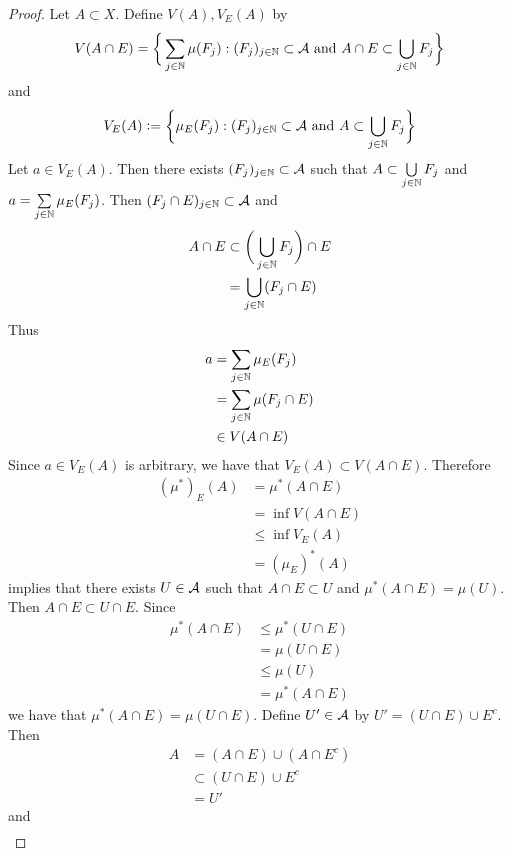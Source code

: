 \documentclass{book}
\begin{document}
	\begin{proof}
		Let $A \subset X$. Define $V(A), V_E(A)$ by 
		$$V(A \cap E) = \bigg \{\sum_{j \in \mathbb{N}} \mu(F_j): (F_j)_{j \in \mathbb{N}} \subset \mathcal{A} \text{ and } A \cap E \subset \bigcup\limits_{j \in \mathbb{N}} F_j \bigg \}$$ 
		and 
		$$V_E(A) \vcentcolon=  \bigg \{\mu_E(F_j): (F_j)_{j \in \mathbb{N}} \subset \mathcal{A} \text{ and } A \subset \bigcup\limits_{j \in \mathbb{N}} F_j  \bigg\}$$
		Let $a \in V_E(A)$. Then there exists $(F_j)_{j \in \mathbb{N}} \subset \mathcal{A}$ such that $A \subset \bigcup\limits_{j \in \mathbb{N}} F_j$ and $a = \sum\limits_{j \in \mathbb{N}} \mu_E(F_j)$. Then $(F_j \cap E)_{j \in \mathbb{N}} \subset \mathcal{A}$ and 
		\begin{align*}
			A \cap E
			& \subset \bigg( \bigcup\limits_{j \in \mathbb{N}} F_j \bigg) \cap E \\
			& = \bigcup\limits_{j \in \mathbb{N}} (F_j  \cap E)
		\end{align*}
		Thus 
		\begin{align*}
			a
			& = \sum\limits_{j \in \mathbb{N}} \mu_E(F_j) \\
			& = \sum\limits_{j \in \mathbb{N}} \mu(F_j \cap E) \\
			& \in V(A \cap E) 
		\end{align*}
		Since $a \in V_E(A)$ is arbitrary, we have that $V_E(A) \subset V(A \cap E)$. Therefore
		\begin{align*}
			(\mu^*)_E(A)
			& = \mu^*(A \cap E) \\
			& = \inf V(A \cap E) \\
			& \leq \inf V_E(A) \\
			& = (\mu_E)^*(A)
		\end{align*}
		 implies that there exists $U \in \mathcal{A}$ such that $A \cap E \subset U$ and $\mu^*(A \cap E) = \mu(U)$. Then $A \cap E \subset U \cap E$. Since 
		\begin{align*}
			\mu^*(A \cap E)
			& \leq \mu^*(U \cap E) \\
			& = \mu(U \cap E) \\
			& \leq \mu(U) \\
			& = \mu^*(A \cap E)
		\end{align*} 
		we have that $\mu^*(A \cap E) = \mu(U \cap E)$. Define $U' \in \mathcal{A}$ by $U' = (U \cap E) \cup E^c$. Then 
		\begin{align*}
			A 
			& = (A \cap E) \cup (A \cap E^c) \\
			& \subset (U \cap E) \cup E^c \\
			& = U'
		\end{align*}
		and 
		\begin{align*}

\end{align*}
\end{proof}
\end{document}
